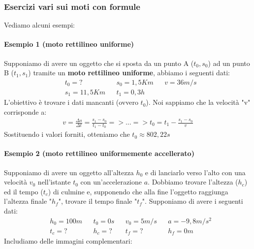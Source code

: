 		\subsubsection{Esercizi vari sui moti con formule}
			Vediamo alcuni esempi:
			\paragraph{Esempio 1 (moto rettilineo uniforme)}
				Supponiamo di avere un oggetto che si sposta da un punto A ($t_0, s_0$) ad un punto B ($t_1, s_1$) tramite un \textbf{moto rettilineo uniforme}, abbiamo i seguenti dati:
				\begin{align*}
					&t_0 = ?&&s_0=1,5Km&&v=36m/s\\
					&s_1 = 11,5Km&&t_1=0,3h
				\end{align*}
				L'obiettivo è trovare i dati mancanti (ovvero $t_0$). Noi sappiamo che la velocità "v" corrisponde a:
				\begin{align*}
					v=\frac{\Delta s}{\Delta t}=\frac{s_1-s_0}{t_1-t_0}=> ... => t_0 = t_1 -\frac{s_1-s_0}{v}
				\end{align*}
				Sostituendo i valori forniti, otteniamo che $t_0 \approx 802,22s$

			\paragraph{Esempio 2 (moto rettilineo uniformemente accellerato)}
				Supponiamo di avere un oggetto all'altezza $h_0$ e di lanciarlo verso l'alto con una velocità $v_0$ nell'istante $t_0$ con un'accelerazione $a$. Dobbiamo trovare l'altezza ($h_c$) ed il tempo ($t_c$) di culmine e, supponendo che alla fine l'oggetto raggiunga l'altezza finale "$h_f$", trovare il tempo finale "$t_f$". Supponiamo di avere i seguenti dati:
				\begin{align*}
					&h_0 = 100m&&t_0=0s&&v_0=5m/s&&a=-9,8m/s^2\\
					&t_c = ? && h_c=? && t_f = ? && h_f = 0m
				\end{align*}
				Includiamo delle immagini complementari:

